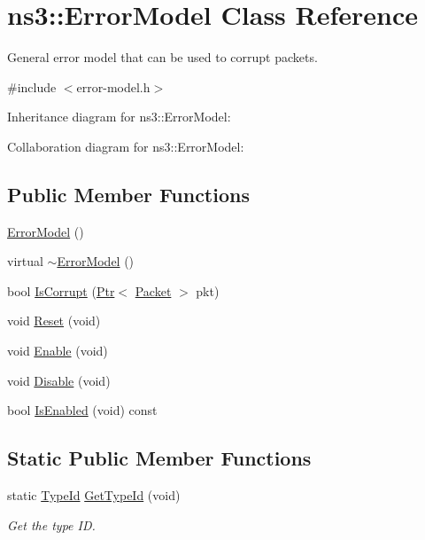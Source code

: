 \hypertarget{classns3_1_1ErrorModel}{}\section{ns3\+:\+:Error\+Model Class Reference}
\label{classns3_1_1ErrorModel}


General error model that can be used to corrupt packets.  




{\ttfamily \#include $<$error-\/model.\+h$>$}



Inheritance diagram for ns3\+:\+:Error\+Model\+:


Collaboration diagram for ns3\+:\+:Error\+Model\+:
\subsection*{Public Member Functions}
\begin{DoxyCompactItemize}
\item 
\hyperlink{classns3_1_1ErrorModel_a89d58fc926bb907d546844d8e6437f30}{Error\+Model} ()
\item 
virtual \hyperlink{classns3_1_1ErrorModel_a3629ca55411702d935a0406468229768}{$\sim$\+Error\+Model} ()
\item 
bool \hyperlink{classns3_1_1ErrorModel_af75222d384e342b46d0aed09d5e3a3fd}{Is\+Corrupt} (\hyperlink{classns3_1_1Ptr}{Ptr}$<$ \hyperlink{classns3_1_1Packet}{Packet} $>$ pkt)
\item 
void \hyperlink{classns3_1_1ErrorModel_a6b7cbe56c27562e5ba6daf2f04bcd282}{Reset} (void)
\item 
void \hyperlink{classns3_1_1ErrorModel_a571d61a2fc9ce2d30df95da7e87b763c}{Enable} (void)
\item 
void \hyperlink{classns3_1_1ErrorModel_a55d35a3e713c31f650577e9f96cf25c0}{Disable} (void)
\item 
bool \hyperlink{classns3_1_1ErrorModel_a471bffecc63bfce9c4dc7b59d7038cd4}{Is\+Enabled} (void) const 
\end{DoxyCompactItemize}
\subsection*{Static Public Member Functions}
\begin{DoxyCompactItemize}
\item 
static \hyperlink{classns3_1_1TypeId}{Type\+Id} \hyperlink{classns3_1_1ErrorModel_a4c77d35dd93ec6a2452f0d2d4a7ee02a}{Get\+Type\+Id} (void)
\begin{DoxyCompactList}\small\item\em Get the type ID. \end{DoxyCompactList}\end{DoxyCompactItemize}
